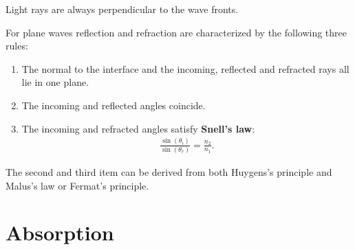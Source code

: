     \begin{theorem}
        Light rays are always perpendicular to the wave fronts.
    \end{theorem}

    \begin{property}
        For plane waves reflection and refraction are characterized by the following three rules:
        \begin{enumerate}
            \item The normal to the interface and the incoming, reflected and refracted rays all lie in one plane.
            \item The incoming and reflected angles coincide.
            \item The incoming and refracted angles satisfy \textbf{Snell's law}:
            \begin{gather}
                \frac{\sin(\theta_i)}{\sin(\theta_r)}=\frac{n_2}{n_1}.
            \end{gather}
        \end{enumerate}
        The second and third item can be derived from both Huygens's principle and Malus's law or Fermat's principle.
    \end{property}

\section{Absorption}

